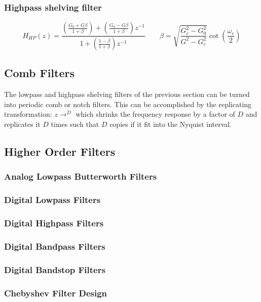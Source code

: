 \subsubsection{Highpass shelving filter}
\[
	H_{HP}(z) = 
	\frac{
		\left(\frac{G_0 + G\beta}{1+\beta}\right) + 
		\left(\frac{G_0-G\beta}{1+\beta}\right)z^{-1}
	}{
		1 +
		\left(\frac{1-\beta}{1+\beta}\right)z^{-1}
	}
	\qquad
	\beta =
		\sqrt{\frac{G_c^2-G_0^2}{G^2-G_c^2}}
		\cot\left(\frac{\omega_c}{2}\right)
\]

\subsection{Comb Filters}
The lowpass and highpass shelving filters of the previous section can be turned into periodic comb or notch filters.
This can be accomplished by the replicating transformation: $z \rightarrow ^{D}$ which shrinks the frequency response by a factor of $D$ and replicates it $D$ times such that $D$ copies if it fit into the Nyquist interval.

\subsection{Higher Order Filters}
\subsubsection{Analog Lowpass Butterworth Filters}
\subsubsection{Digital Lowpass Filters}
\subsubsection{Digital Highpass Filters}
\subsubsection{Digital Bandpass Filters}
\subsubsection{Digital Bandstop Filters}
\subsubsection{Chebyshev Filter Design}
